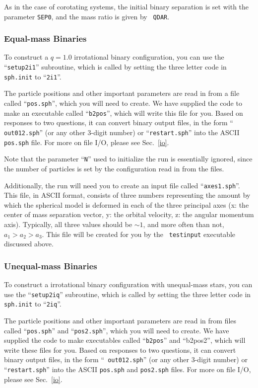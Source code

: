 As in the case of corotating systems, the initial binary separation is
set with the parameter {\tt SEP0}, and the mass ratio is given by {\tt
QDAR}.

\subsubsection{Equal-mass Binaries}\label{in:2i:1}
To construct a $q=1.0$ irrotational binary configuration,
you can use the
``{\tt setup2i1}'' subroutine, which is called by setting the three
letter code in {\tt sph.init} to ``{\tt 2i1}''.

The particle positions and other important parameters are read in from
a file called ``{\tt pos.sph}'', which you will need to create.  We
have supplied the code to make an executable called ``{\tt b2pos}'',
which will write this file for you.  Based on responses to two
questions, it can convert binary output files, in the form ``{\tt
out012.sph}'' (or any other 3-digit number) or ``{\tt restart.sph}'' 
into the ASCII {\tt pos.sph} file.  For more on file I/O, please see
Sec.~\ref{io}.  

Note that the parameter ``{\tt N}'' used to initialize the run is
essentially ignored, since the number of particles is set by the
configuration read in from the files.

Additionally, the run will need you to create an input file called
``{\tt axes1.sph}''.  This file, in ASCII format, consists of three
numbers representing the amount by which the spherical model is
deformed in each of the three principal axes (x: the center of mass
separation vector, y: the orbital velocity, z: the angular momentum axis).
Typically, all three values should be $\sim 1$, and more often than
not, $a_1>a_2>a_3$.  This file will be created for you by the {\tt
testinput} executable discussed above.

\subsubsection{Unequal-mass Binaries}\label{in:2i:q}
To construct a irrotational binary configuration with unequal-mass stars,
you can use the
``{\tt setup2iq}'' subroutine, which is called by setting the three
letter code in {\tt sph.init} to ``{\tt 2iq}''.

The particle positions and other important parameters are read in from
files called ``{\tt pos.sph}'' and ``{\tt pos2.sph}'', 
which you will need to create.  We
have supplied the code to make executables called ``{\tt b2pos}'' and
``{b2pos2}'',
which will write these files for you.  Based on responses to two
questions, it can convert binary output files, in the form ``{\tt
out012.sph}'' (or any other 3-digit number) or ``{\tt restart.sph}'' 
into the ASCII {\tt pos.sph} and {\tt pos2.sph} files.  
For more on file I/O, please see Sec.~\ref{io}.  

